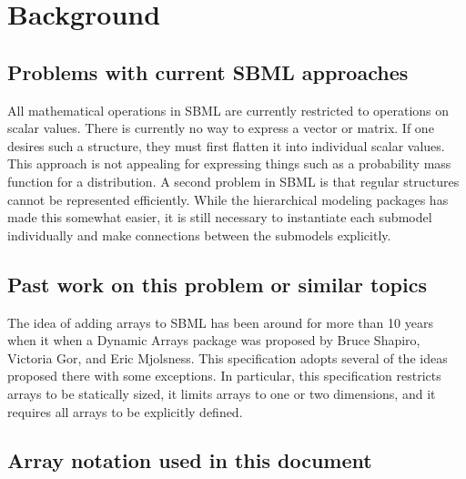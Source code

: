 
\section{ Background }
\label{background}

\subsection{ Problems with current SBML approaches }

All mathematical operations in SBML are currently restricted to operations on scalar values.  There is currently no way to express a vector or matrix.  If one desires such a structure, they must first flatten it into individual scalar values.  This approach is not appealing for expressing things such as a probability mass function for a distribution.  A second problem in SBML is that regular structures cannot be represented efficiently.  While the hierarchical modeling packages has made this somewhat easier, it is still necessary to instantiate each submodel individually and make connections between the submodels explicitly.  

\subsection{ Past work on this problem or similar topics }

The idea of adding arrays to SBML has been around for more than 10 years when it when a Dynamic Arrays package was proposed by Bruce Shapiro, Victoria Gor, and Eric Mjolsness.  This specification adopts several of the ideas proposed there with some exceptions.  In particular, this specification restricts arrays to be statically sized, it limits arrays to one or two dimensions, and it requires all arrays to be explicitly defined.  


\subsection{Array notation used in this document}

